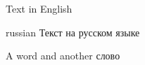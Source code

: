 \documentclass{article}
\begin{document}
Text in English

\begin{otherlanguage*}{russian}
Текст на русском языке
\end{otherlanguage*}

A word and another \foreignlanguage{russian}{слово}
\end{document}
